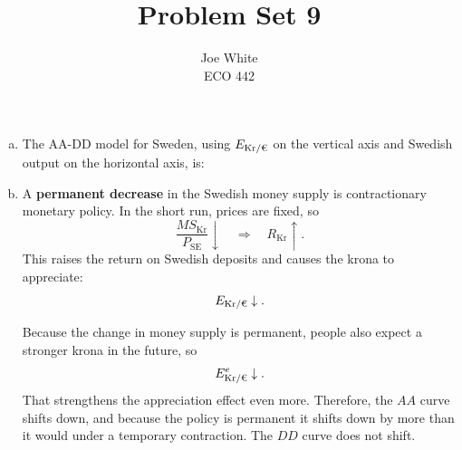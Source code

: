 \documentclass[11pt]{article}
\newenvironment{problem}[2][Problem]{\begin{trivlist}
\item[\hskip \labelsep {\bfseries #1}\hskip \labelsep {\bfseries #2.}]
\leavevmode\par
}{\end{trivlist}}
\newcommand{\Ekr}{E_{\text{Kr}/\text{\texteuro}}}
\newcommand{\Ekre}{E^e_{\text{Kr}/\text{\texteuro}}}
\begin{document}
\title{Problem Set 9}
\author{Joe White\\ECO 442}
\maketitle

\begin{problem}{1}

\begin{enumerate}[(a)]

\item The AA-DD model for Sweden, using \(\Ekr\) on the vertical axis and Swedish output on the horizontal axis, is:

\begin{center}
\end{center}

\item A \textbf{permanent decrease} in the Swedish money supply is contractionary monetary policy. In the short run, prices are fixed, so
\[
\frac{MS_{\text{Kr}}}{P_{\text{SE}}}\downarrow
\quad \Rightarrow \quad
R_{\text{Kr}}\uparrow.
\]
This raises the return on Swedish deposits and causes the krona to appreciate:
\[
\Ekr \downarrow.
\]

Because the change in money supply is permanent, people also expect a stronger krona in the future, so
\[
\Ekre \downarrow.
\]
That strengthens the appreciation effect even more. Therefore, the \(AA\) curve shifts down, and because the policy is permanent it shifts down by more than it would under a temporary contraction. The \(DD\) curve does not shift.

\begin{center}
\end{center}
\end{enumerate}
\end{problem}
\end{document}

